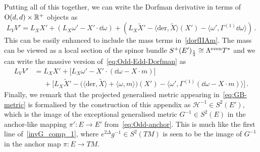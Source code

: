 \documentclass[debug]{phd}
\begin{document}
			Putting all of this together, we can write the Dorfman derivative in terms of $\mathrm{O}(d,d)\times\mathbb{R}^+$ objects as
					\begin{equation}\label{eq:Odd-Edd-Dorfman}
							L_V V' = L_X X' + (L_X \omega' - X' \cdot \dd \omega) + (L_X \tilde{X}' - \langle \mathrm{der} , \tilde{X} \rangle (X') - \langle \omega' , \Gamma^{(1)} \dd \omega \rangle)\,.
					\end{equation}
			This can be easily enhanced to include the mass terms in~\eqref{dorfIIAm}. 
			The mass can be viewed as a local section of the spinor bundle $S^+(E')_{\frac12}\cong \Lambda^{\rm even} T^*$ and we can write the massive version of~\eqref{eq:Odd-Edd-Dorfman} as
					\begin{equation}\label{eq:massive-Odd-Edd-Dorfman}
						\begin{split}
							L_V V' &= L_X X' + \Big[ L_X \omega' - X' \cdot (\dd\omega - X\cdot m)\Big] \\
		 						& \phantom{=}+ \Big[ L_X \tilde{X}' - \big(\langle \mathrm{der} , \tilde{X} \rangle + \langle \omega , m \rangle\big)(X') - \langle \omega' , \Gamma^{(1)} (\dd \omega - X\cdot m)\rangle \Big]\,.
						\end{split}
					\end{equation}
			Finally, we remark that the projected generalised metric appearing in~\eqref{eq:GB-metric} is formalised by the construction of this appendix as $\mathcal{H}^{-1} \in S^2(E')$, which is the image of the exceptional generalised metric $G^{-1} \in S^2(E)$ in the anchor-like mapping $\pi' : E \rightarrow E'$ from~\eqref{eq:Odd-anchor}. 
			This is much like the first line of~\eqref{invG_comp_1}, where $e^{2\Delta} g^{-1} \in S^2(TM)$ is seen to be the image of $G^{-1}$ in the anchor map $\pi : E \rightarrow TM$.
\end{document}
